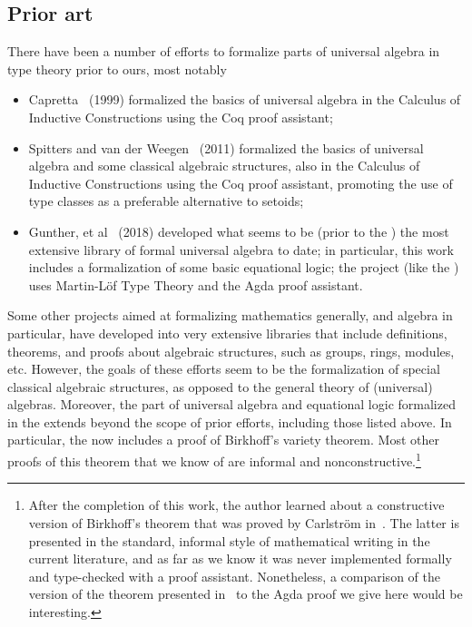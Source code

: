 \subsection*{Prior art}
There have been a number of efforts to formalize parts of universal algebra in type theory prior to ours, most notably
\begin{itemize}
  \item Capretta~\cite{Capretta:1999} (1999) formalized the basics of universal algebra in the Calculus of Inductive Constructions using the Coq proof assistant;
    \item Spitters and van der Weegen~\cite{Spitters:2011} (2011) formalized the basics of universal algebra and some classical algebraic structures, also in the Calculus of Inductive Constructions using the Coq proof assistant, promoting the use of type classes as a preferable alternative to setoids;
 \item Gunther, et al~\cite{Gunther:2018} (2018) developed what seems to be (prior to the \ualib) the most extensive library of formal universal algebra to date; in particular, this work includes a formalization of some basic equational logic; the project (like the \ualib) uses Martin-L\"of Type Theory and the Agda proof assistant.
\end{itemize}
Some other projects aimed at formalizing mathematics generally, and algebra in particular, have developed into very extensive libraries that include definitions, theorems, and proofs about algebraic structures, such as groups, rings, modules, etc.  However, the goals of these efforts seem to be the formalization of special classical algebraic structures, as opposed to the general theory of (universal) algebras. Moreover, the part of universal algebra and equational logic formalized in the \ualib extends beyond the scope of prior efforts, including those listed above. In particular, the \ualib now includes a proof of Birkhoff's variety theorem.  Most other proofs of this theorem that we know of are informal and nonconstructive.\footnote{After the completion of this work, the author learned about a constructive version of Birkhoff's theorem that was proved by Carlstr\"om in~\cite{Carlstrom:2008}.  The latter is presented in the standard, informal style of mathematical writing in the current literature, and as far as we know it was never implemented formally and type-checked with a proof assistant. Nonetheless, a comparison of the version of the theorem presented in~\cite{Carlstrom:2008} to the Agda proof we give here would be interesting.}


